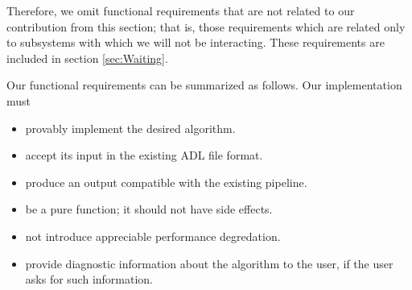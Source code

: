 \documentclass[12pt]{report}
\begin{document}
Therefore, we omit functional requirements that are not related to our
contribution from this section; that is, those requirements which are related
only to subsystems with which we will not be interacting. These requirements are
included in section \ref{sec:Waiting}. 

Our functional requirements can be summarized as follows. Our implementation must
\begin{itemize}
\item provably implement the desired algorithm.
\item accept its input in the existing ADL file format.
\item produce an output compatible with the existing pipeline. 
\item be a pure function; it should not have side effects.  
\item not introduce appreciable performance degredation. 
\item provide diagnostic information about the algorithm to
the user, if the user asks for such information.
\end{itemize}


 
	 
\end{document}
